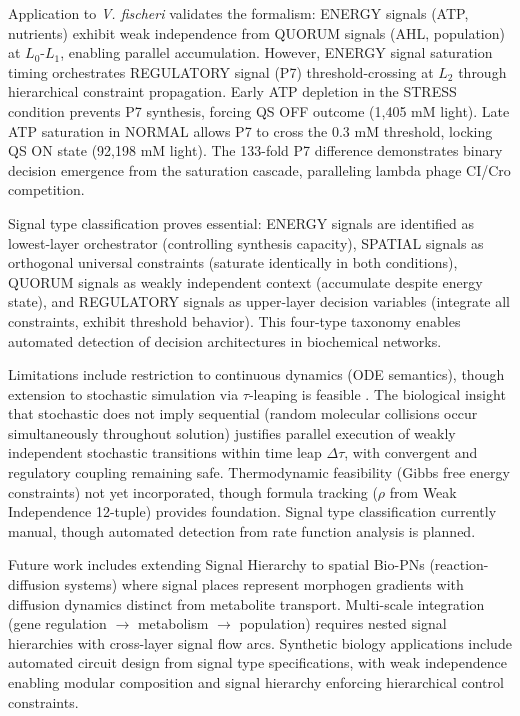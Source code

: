 \documentclass[twocolumn,11pt]{article}
\begin{document}
Application to \textit{V. fischeri} validates the formalism: ENERGY signals (ATP, nutrients) exhibit weak independence from QUORUM signals (AHL, population) at $L_0$-$L_1$, enabling parallel accumulation. However, ENERGY signal saturation timing orchestrates REGULATORY signal (P7) threshold-crossing at $L_2$ through hierarchical constraint propagation. Early ATP depletion in the STRESS condition prevents P7 synthesis, forcing QS OFF outcome (1,405 mM light). Late ATP saturation in NORMAL allows P7 to cross the 0.3 mM threshold, locking QS ON state (92,198 mM light). The 133-fold P7 difference demonstrates binary decision emergence from the saturation cascade, paralleling lambda phage CI/Cro competition.

Signal type classification proves essential: ENERGY signals are identified as lowest-layer orchestrator (controlling synthesis capacity), SPATIAL signals as orthogonal universal constraints (saturate identically in both conditions), QUORUM signals as weakly independent context (accumulate despite energy state), and REGULATORY signals as upper-layer decision variables (integrate all constraints, exhibit threshold behavior). This four-type taxonomy enables automated detection of decision architectures in biochemical networks.

Limitations include restriction to continuous dynamics (ODE semantics), though extension to stochastic simulation via $\tau$-leaping is feasible \cite{Lopez2013}. The biological insight that stochastic does not imply sequential (random molecular collisions occur simultaneously throughout solution) justifies parallel execution of weakly independent stochastic transitions within time leap $\Delta\tau$, with convergent and regulatory coupling remaining safe. Thermodynamic feasibility (Gibbs free energy constraints) not yet incorporated, though formula tracking ($\rho$ from Weak Independence 12-tuple) provides foundation. Signal type classification currently manual, though automated detection from rate function analysis is planned.

Future work includes extending Signal Hierarchy to spatial Bio-PNs (reaction-diffusion systems) where signal places represent morphogen gradients with diffusion dynamics distinct from metabolite transport. Multi-scale integration (gene regulation $\rightarrow$ metabolism $\rightarrow$ population) requires nested signal hierarchies \cite{Liu2019} with cross-layer signal flow arcs. Synthetic biology applications include automated circuit design from signal type specifications, with weak independence enabling modular composition and signal hierarchy enforcing hierarchical control constraints.
\end{document}
